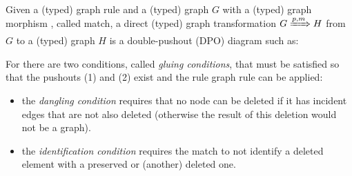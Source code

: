 \begin{definition} Given a (typed) graph rule \graphrule{} and a (typed) graph $G$ with a (typed) graph morphism \match, called match, a direct (typed) graph transformation $G \xRightarrow{p,m} H$ from $G$ to a (typed) graph $H$ is a double-pushout (DPO) diagram such as:


  For  there are two conditions, called \emph{gluing conditions}, that must be satisfied so that the pushouts (1) and (2) exist and the rule graph rule can be applied:

\begin{itemize}
  \item the \emph{dangling condition} requires that no node can be deleted if it has incident edges that are not also deleted (otherwise the result of this deletion would not be a graph).  
  \item the \emph{identification condition} requires the match to not identify a deleted element with a preserved or (another) deleted one.
\end{itemize}

\end{definition}


